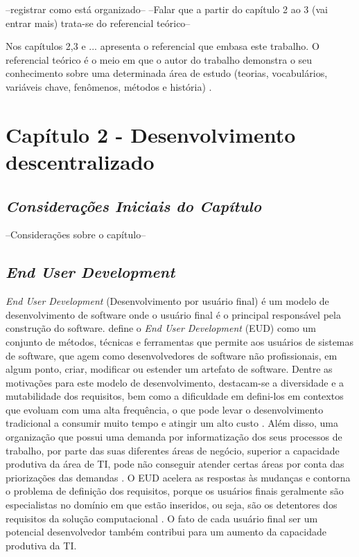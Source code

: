 --registrar como está organizado--
--Falar que a partir do capítulo 2 ao 3 (vai entrar mais) trata-se do referencial teórico--

Nos capítulos 2,3 e ... apresenta o referencial que embasa este trabalho. O referencial teórico é o meio em que o autor do trabalho demonstra o seu conhecimento sobre uma determinada área de estudo (teorias, vocabulários, variáveis chave, fenômenos, métodos e história) \cite{randolph2009}.


\chapter[Capítulo 2 - Desenvolvimento descentralizado]{Capítulo 2 - Desenvolvimento descentralizado}

\section{\textit{Considerações Iniciais do Capítulo}}

--Considerações sobre o capítulo--

\section{\textit{End User Development}}

\textit{End User Development} (Desenvolvimento por usuário final) é um modelo de desenvolvimento de software onde o usuário final é o principal responsável pela construção do software.  define o \textit{End User Development} (EUD) como um conjunto de métodos, técnicas e ferramentas que permite aos usuários de sistemas de software, que agem como desenvolvedores de software não profissionais, em algum ponto, criar, modificar ou estender um artefato de software. Dentre as motivações para este modelo de desenvolvimento, destacam-se a diversidade e a mutabilidade dos requisitos, bem como a dificuldade em defini-los em contextos que evoluam com uma alta frequência, o que pode levar o desenvolvimento tradicional a consumir muito tempo e atingir um alto custo \cite{lieberman2006}. Além disso, uma organização que possui uma demanda por informatização dos seus processos de trabalho, por parte das suas diferentes áreas de negócio, superior a capacidade produtiva da área de TI, pode não conseguir atender certas áreas por conta das priorizações das demandas \cite{artigoTcuGovTI}. O EUD acelera as respostas às mudanças e contorna o problema de definição dos requisitos, porque os usuários finais geralmente são especialistas no domínio em que estão inseridos, ou seja, são os detentores dos requisitos da solução computacional \cite{fischer2004}. O fato de cada usuário final ser um potencial desenvolvedor também contribui para um aumento da capacidade produtiva da TI.

